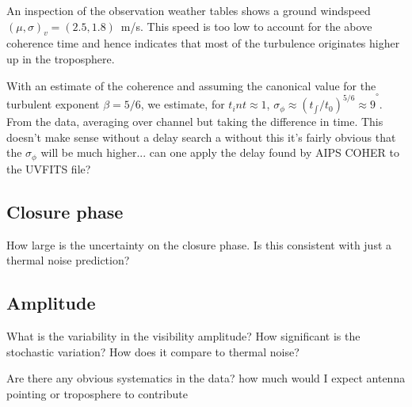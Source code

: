 An inspection of the observation weather tables shows a ground windspeed  $(\mu, \sigma)_v = (2.5, 1.8)$~m/s. This speed is too low to account for the above coherence time and hence indicates that most of the turbulence originates higher up in the troposphere.

With an estimate of the coherence and assuming the canonical value for the turbulent exponent $\beta = 5/6$, we estimate, for $t_int \approx 1$, ${\sigma_\phi \approx (t_{\int}/t_0)^{5/6} \approx 9}^\circ$. From the data, averaging over channel but taking the difference in time. This doesn't make sense without a delay search a without this it's fairly obvious that the $\sigma_\phi$ will be much higher... can one apply the delay found by AIPS COHER to the UVFITS file? 

\subsection{Closure phase} 

How large is the uncertainty on the closure phase. Is this consistent with just a thermal noise prediction?


\subsection{Amplitude}

What is the variability in the visibility amplitude? How significant is the stochastic variation? How does it compare to thermal noise?

Are there any obvious systematics in the data? how much would I expect antenna pointing or troposphere to contribute
